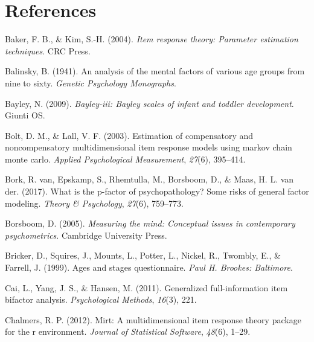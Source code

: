 \documentclass[10pt, letterpaper]{article}
\begin{document}
\hypertarget{references}{%
\section{References}\label{references}}

\setlength{\parindent}{-0.1in}
\setlength{\leftskip}{0.125in}

\noindent

\hypertarget{refs}{}
\leavevmode\hypertarget{ref-baker2004item}{}%
Baker, F. B., \& Kim, S.-H. (2004). \emph{Item response theory:
Parameter estimation techniques}. CRC Press.

\leavevmode\hypertarget{ref-balinsky1941analysis}{}%
Balinsky, B. (1941). An analysis of the mental factors of various age
groups from nine to sixty. \emph{Genetic Psychology Monographs}.

\leavevmode\hypertarget{ref-bayley2009bayley}{}%
Bayley, N. (2009). \emph{Bayley-iii: Bayley scales of infant and toddler
development}. Giunti OS.

\leavevmode\hypertarget{ref-bolt2003estimation}{}%
Bolt, D. M., \& Lall, V. F. (2003). Estimation of compensatory and
noncompensatory multidimensional item response models using markov chain
monte carlo. \emph{Applied Psychological Measurement}, \emph{27}(6),
395--414.

\leavevmode\hypertarget{ref-van2017p}{}%
Bork, R. van, Epskamp, S., Rhemtulla, M., Borsboom, D., \& Maas, H. L.
van der. (2017). What is the p-factor of psychopathology? Some risks of
general factor modeling. \emph{Theory \& Psychology}, \emph{27}(6),
759--773.

\leavevmode\hypertarget{ref-borsboom2005measuring}{}%
Borsboom, D. (2005). \emph{Measuring the mind: Conceptual issues in
contemporary psychometrics}. Cambridge University Press.

\leavevmode\hypertarget{ref-bricker1999ages}{}%
Bricker, D., Squires, J., Mounts, L., Potter, L., Nickel, R., Twombly,
E., \& Farrell, J. (1999). Ages and stages questionnaire. \emph{Paul H.
Brookes: Baltimore}.

\leavevmode\hypertarget{ref-cai2011generalized}{}%
Cai, L., Yang, J. S., \& Hansen, M. (2011). Generalized full-information
item bifactor analysis. \emph{Psychological Methods}, \emph{16}(3), 221.

\leavevmode\hypertarget{ref-chalmers2012mirt}{}%
Chalmers, R. P. (2012). Mirt: A multidimensional item response theory
package for the r environment. \emph{Journal of Statistical Software},
\emph{48}(6), 1--29.
\end{document}
